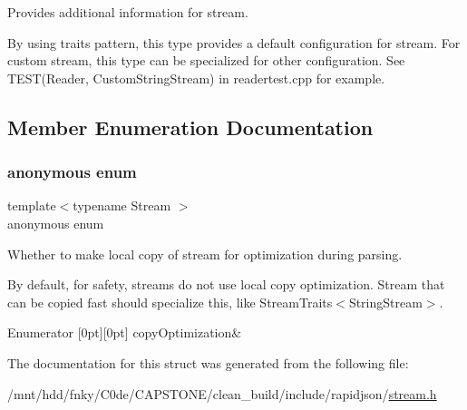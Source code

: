 Provides additional information for stream. 

By using traits pattern, this type provides a default configuration for stream. For custom stream, this type can be specialized for other configuration. See T\+E\+S\+T(\+Reader, Custom\+String\+Stream) in readertest.\+cpp for example. 

\subsection{Member Enumeration Documentation}
\mbox{\label{structStreamTraits_a6f70307b686a2577c6a274457f0688bb}} 
\subsubsection{\texorpdfstring{anonymous enum}{anonymous enum}}
{\footnotesize\ttfamily template$<$typename Stream $>$ \\
anonymous enum}



Whether to make local copy of stream for optimization during parsing. 

By default, for safety, streams do not use local copy optimization. Stream that can be copied fast should specialize this, like Stream\+Traits$<$\+String\+Stream$>$. \begin{DoxyEnumFields}{Enumerator}
[0pt][0pt]{}\mbox{\label{structStreamTraits_a6f70307b686a2577c6a274457f0688bba0300ac4c098b0d59f43a0c4e1ec86eac}} 
copy\+Optimization&\\
\hline

\end{DoxyEnumFields}


The documentation for this struct was generated from the following file\+:\begin{DoxyCompactItemize}
\item 
/mnt/hdd/fnky/\+C0de/\+C\+A\+P\+S\+T\+O\+N\+E/clean\+\_\+build/include/rapidjson/\hyperlink{stream_8h}{stream.\+h}\end{DoxyCompactItemize}
